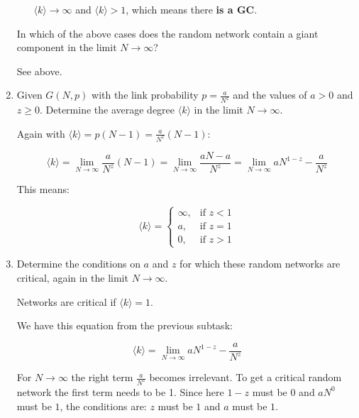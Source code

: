 \begin{enumerate}
\begin{itemize}
			$\langle k \rangle \rightarrow \infty$ and $\langle k \rangle > 1$, which means there \textbf{is a GC}. 
	\end{itemize}

	In which of the above cases does the random network contain a giant component in the limit $N \rightarrow \infty$?
	
	See above.
	
	\item Given $G(N,p)$ with the link probability $p = \frac{a}{N^z}$ and the values of $a > 0$ and $z \geq 0$. Determine the average degree $\langle k \rangle$ in the limit $N \rightarrow \infty$.
	
	Again with $\langle k \rangle = p(N-1) = \frac{a}{N^z} (N-1)$:
	
	\begin{equation}
		\langle k \rangle 
		= \lim\limits_{N \rightarrow \infty} \frac{a}{N^z}(N-1)
		= \lim\limits_{N \rightarrow \infty} \frac{aN - a}{N^z}
		= \lim\limits_{N \rightarrow \infty} aN^{1-z} - \frac{a}{N^z}
	\end{equation}
	
	This means:
  
	\[
		\langle k \rangle = 
			\begin{cases}
	   			\infty, & \text{if } z < 1 \\
	   			a, & \text{if }z = 1 \\
	   			0, & \text{if }z > 1
			\end{cases}
	\]

	\item Determine the conditions on $a$ and $z$ for which these random networks are critical,  again in the limit $N \rightarrow \infty$.
	
	Networks are critical if $\langle k \rangle = 1$.
	
	We have this equation from the previous subtask: 
	
	\begin{equation}
		\langle k \rangle = \lim\limits_{N \rightarrow \infty} aN^{1-z} - \frac{a}{N^z}
	\end{equation}
	
	For $N \rightarrow \infty$ the right term $\frac{a}{N^z}$ becomes irrelevant. To get a critical random network the first term needs to be 1.
	Since here $1-z$ must be $0$ and $aN^0$ must be $1$, the conditions are:  $z$ must be $1$ and $a$ must be $1$.
	
\end{enumerate}
